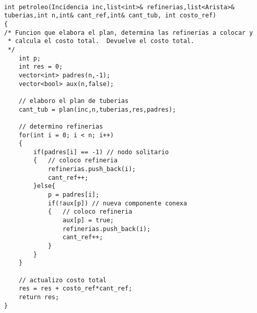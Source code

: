 \documentclass[a4paper]{article}
\begin{document}
\begin{lstlisting}

int petroleo(Incidencia inc,list<int>& refinerias,list<Arista>& tuberias,int n,int& cant_ref,int& cant_tub, int costo_ref)
{
/* Funcion que elabora el plan, determina las refinerias a colocar y 
 * calcula el costo total.  Devuelve el costo total.
 */
	int p;
	int res = 0;
	vector<int> padres(n,-1);
	vector<bool> aux(n,false);
	
	// elaboro el plan de tuberias
	cant_tub = plan(inc,n,tuberias,res,padres);
	
	// determino refinerias
	for(int i = 0; i < n; i++)
	{
		if(padres[i] == -1)	// nodo solitario
		{	// coloco refineria
			refinerias.push_back(i);
			cant_ref++;
		}else{
			p = padres[i];
			if(!aux[p])	// nueva componente conexa
			{	// coloco refineria
				aux[p] = true;
				refinerias.push_back(i);
				cant_ref++;
			}
		}
	}
	
	// actualizo costo total
	res = res + costo_ref*cant_ref;
	return res;
}
\end{lstlisting}
\end{document}
